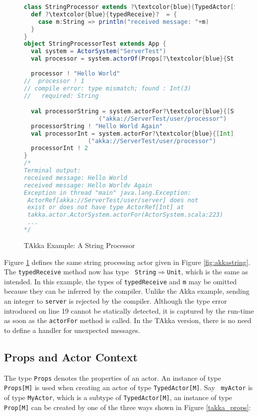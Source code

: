 \begin{figure}[!h]
      \begin{lstlisting}[language=scala, escapechar=?]
class StringProcessor extends ?\textcolor{blue}{TypedActor[String]}?  {
  def ?\textcolor{blue}{typedReceive}?  = {
    case m:String => println("received message: "+m)
  }
}
object StringProcessorTest extends App {
  val system = ActorSystem("ServerTest")
  val processor = system.actorOf(Props[?\textcolor{blue}{String}?, StringProcessor], "processor")
  
  processor ! "Hello World"
//  processor ! 1
// compile error: type mismatch; found : Int(3)
//   required: String

  val processorString = system.actorFor?\textcolor{blue}{[String]}?
                     ("akka://ServerTest/user/processor")
  processorString ! "Hello World Again"
  val processorInt = system.actorFor?\textcolor{blue}{[Int]}?
                  ("akka://ServerTest/user/processor")
  processorInt ! 2
}
/*
Terminal output:
received message: Hello World
received message: Hello Worldv Again
Exception in thread "main" java.lang.Exception: 
 ActorRef[akka://ServerTest/user/server] does not 
 exist or does not have type ActorRef[Int] at 
 takka.actor.ActorSystem.actorFor(ActorSystem.scala:223)
 ...
*/
    \end{lstlisting}
    \caption{TAkka Example: A String Processor}
    \label{takkastring}
\end{figure}




Figure \ref{takkastring} defines the same string processing actor given in
Figure \ref{fig:akkastring}.  The {\tt typedReceive} method now has type 
{\tt 
String$\Rightarrow$Unit}, which is the same as intended.  In this example, the 
types of {\tt typedReceive} and {\tt m} may be omitted because they 
can be inferred by the compiler.  Unlike the Akka example, sending an integer 
to {\tt server} is rejected by the compiler.  Although the type error 
introduced on line 19 cannot be statically detected, it is captured by the 
run-time as soon as the {\tt actorFor} method is called.  In the TAkka version, 
there is no need to define a handler for unexpected messages.

\subsection{Props and Actor Context}
\label{actor_context}
The type {\tt Props} denotes the properties of an actor.   An instance  of type {\tt 
Props[M]} is used when creating an actor of type {\tt TypedActor[M]}.  Say {\tt 
myActor} is of type {\tt MyActor}, which is a subtype of {\tt TypedActor[M]}, an instance 
of type {\tt Prop[M]} can be created by one of the three ways shown in Figure 
\ref{takka_props}:


